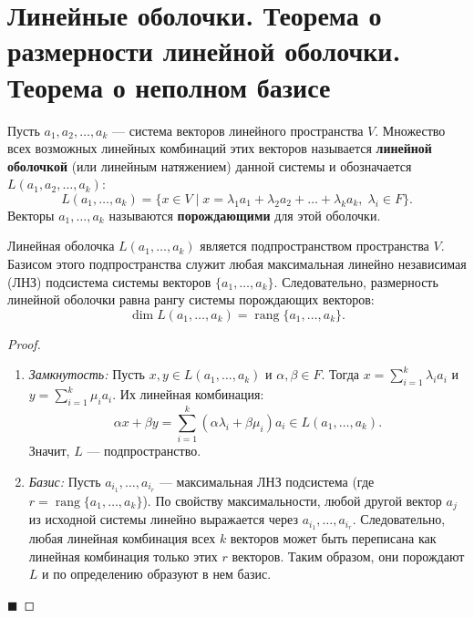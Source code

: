 \section{Линейные оболочки. Теорема о размерности линейной оболочки. Теорема о неполном базисе}

\begin{definition}
Пусть $a_1, a_2, \dots, a_k$ --- система векторов линейного пространства $V$. Множество всех возможных линейных комбинаций этих векторов называется \textbf{линейной оболочкой} (или линейным натяжением) данной системы и обозначается $L(a_1, a_2, \dots, a_k)$:
\[
L(a_1, \dots, a_k) = \{ x \in V \mid x = \lambda_1 a_1 + \lambda_2 a_2 + \dots + \lambda_k a_k, \; \lambda_i \in F \}.
\]
Векторы $a_1, \dots, a_k$ называются \textbf{порождающими} для этой оболочки.
\end{definition}

\begin{theorem}
Линейная оболочка $L(a_1, \dots, a_k)$ является подпространством пространства $V$. Базисом этого подпространства служит любая максимальная линейно независимая (ЛНЗ) подсистема системы векторов $\{a_1, \dots, a_k\}$. Следовательно, размерность линейной оболочки равна рангу системы порождающих векторов:
\[
\dim L(a_1, \dots, a_k) = \operatorname{rang}\{a_1, \dots, a_k\}.
\]
\end{theorem}

\begin{proof}
\begin{enumerate}
    \item \textit{Замкнутость:} Пусть $x, y \in L(a_1, \dots, a_k)$ и $\alpha, \beta \in F$. Тогда $x = \sum_{i=1}^k \lambda_i a_i$ и $y = \sum_{i=1}^k \mu_i a_i$. Их линейная комбинация:
    \[
    \alpha x + \beta y = \sum_{i=1}^k (\alpha \lambda_i + \beta \mu_i) a_i \in L(a_1, \dots, a_k).
    \]
    Значит, $L$ --- подпространство.
    \item \textit{Базис:} Пусть $a_{i_1}, \dots, a_{i_r}$ --- максимальная ЛНЗ подсистема (где $r = \operatorname{rang}\{a_1, \dots, a_k\}$). По свойству максимальности, любой другой вектор $a_j$ из исходной системы линейно выражается через $a_{i_1}, \dots, a_{i_r}$. Следовательно, любая линейная комбинация всех $k$ векторов может быть переписана как линейная комбинация только этих $r$ векторов. Таким образом, они порождают $L$ и по определению образуют в нем базис.
\end{enumerate}
\hfill$\blacksquare$
\end{proof}

